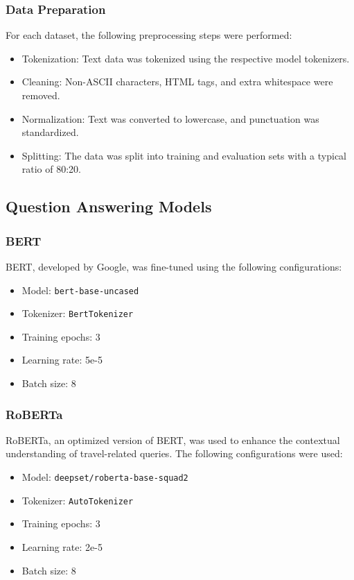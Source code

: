 \documentclass[conference]{IEEEtran}
\begin{document}
        \subsubsection{Data Preparation}

            For each dataset, the following preprocessing steps were performed:
            \begin{itemize}
                \item Tokenization: Text data was tokenized using the respective model tokenizers.
                \item Cleaning: Non-ASCII characters, HTML tags, and extra whitespace were removed.
                \item Normalization: Text was converted to lowercase, and punctuation was standardized.
                \item Splitting: The data was split into training and evaluation sets with a typical ratio of 80:20.
            \end{itemize}

    \subsection{Question Answering Models}

        \subsubsection{BERT}

            BERT, developed by Google, was fine-tuned using the following configurations:
            \begin{itemize}
                \item Model: \texttt{bert-base-uncased}
                \item Tokenizer: \texttt{BertTokenizer}
                \item Training epochs: 3
                \item Learning rate: 5e-5
                \item Batch size: 8
            \end{itemize}

        \subsubsection{RoBERTa}

            RoBERTa, an optimized version of BERT, was used to enhance the contextual understanding of travel-related queries. The following configurations were used:
            \begin{itemize}
                \item Model: \texttt{deepset/roberta-base-squad2}
                \item Tokenizer: \texttt{AutoTokenizer}
                \item Training epochs: 3
                \item Learning rate: 2e-5
                \item Batch size: 8
            \end{itemize}
\end{document}
